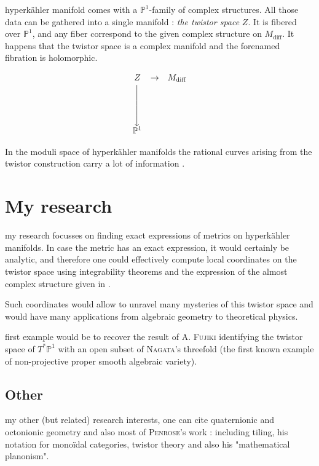 \documentclass[a3, 14pt, ruledsections]{sciposter}
\begin{document}
\begin{multicols}{2}
 hyperk\"{a}hler manifold comes with a $\mathbb{P}^1$-family of complex structures. All those data can be gathered into a single manifold : \textit{the twistor space} $Z$. It is fibered over $\mathbb{P}^1$, and any fiber correspond to the given complex structure on $M_\text{diff}$. It happens that the twistor space is a complex manifold and the forenamed fibration is holomorphic.

\[
\begin{array}{ccc}
Z & \rightarrow & M_\text{diff}\\
\left\downarrow\rule{0cm}{1cm}\right. & & \\
\mathbb{P}^1
\end{array}
\]

In the moduli space of hyperk\"{a}hler manifolds the rational curves arising from the twistor construction carry a lot of information \cite{Verbitsky}.

\section*{My research}
 my research focusses on finding exact expressions of metrics on hyperk\"{a}hler manifolds. In case the metric has an exact expression, it would certainly be analytic, and therefore one could effectively compute local coordinates on the twistor space using integrability theorems and the expression of the almost complex structure given in \cite{HKLR}.

Such coordinates would allow to unravel many mysteries of this twistor space and would have many applications from algebraic geometry to theoretical physics.

 first example would be to recover the result of \textsc{A. Fujiki} \cite{Fujiki} identifying the twistor space of $T^*\mathbb{P}^1$ with an open subset of \textsc{Nagata}'s threefold (the first known example of non-projective proper smooth algebraic variety).

\subsection*{Other}

 my other (but related) research interests, one can cite quaternionic and octonionic geometry and also most of  \textsc{Penrose}'s work : including tiling, his notation for mono{\"{i}}dal categories, twistor theory and also his "mathematical planonism".

\end{multicols}



\end{document}
